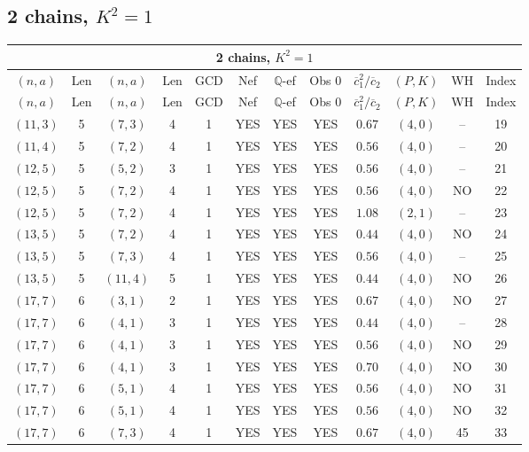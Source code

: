 \subsection{2 chains, $K^2 = 1$}
\begin{longtable}{|c|c|c|c|c|c|c|c|c|c|c|c|}
\hline
\multicolumn{12}{|c|}{2 chains, $K^2 = 1$}\\
\hline
$(n,a)$ & Len & $(n,a)$ & Len & GCD & Nef & $\mathbb Q$-ef & Obs 0 & $\overline c_1^2 / \overline c_2$ & $(P,K)$ & WH & Index\\
\hline
\endfirsthead

\hline
$(n,a)$ & Len & $(n,a)$ & Len & GCD & Nef & $\mathbb Q$-ef & Obs 0 & $\overline c_1^2 / \overline c_2$ & $(P,K)$ & WH & Index\\
\hline
\endhead
\hline
\endfoot

$(11,3)$ & 5 & $(7,3)$ & 4 & 1 & YES & YES & YES & $0.67$ & $(4,0)$ & -- & 19\\
$(11,4)$ & 5 & $(7,2)$ & 4 & 1 & YES & YES & YES & $0.56$ & $(4,0)$ & -- & 20\\
$(12,5)$ & 5 & $(5,2)$ & 3 & 1 & YES & YES & YES & $0.56$ & $(4,0)$ & -- & 21\\
$(12,5)$ & 5 & $(7,2)$ & 4 & 1 & YES & YES & YES & $0.56$ & $(4,0)$ & NO & 22\\
$(12,5)$ & 5 & $(7,2)$ & 4 & 1 & YES & YES & YES & $1.08$ & $(2,1)$ & -- & 23\\
$(13,5)$ & 5 & $(7,2)$ & 4 & 1 & YES & YES & YES & $0.44$ & $(4,0)$ & NO & 24\\
$(13,5)$ & 5 & $(7,3)$ & 4 & 1 & YES & YES & YES & $0.56$ & $(4,0)$ & -- & 25\\
$(13,5)$ & 5 & $(11,4)$ & 5 & 1 & YES & YES & YES & $0.44$ & $(4,0)$ & NO & 26\\
$(17,7)$ & 6 & $(3,1)$ & 2 & 1 & YES & YES & YES & $0.67$ & $(4,0)$ & NO & 27\\
$(17,7)$ & 6 & $(4,1)$ & 3 & 1 & YES & YES & YES & $0.44$ & $(4,0)$ & -- & 28\\
$(17,7)$ & 6 & $(4,1)$ & 3 & 1 & YES & YES & YES & $0.56$ & $(4,0)$ & NO & 29\\
$(17,7)$ & 6 & $(4,1)$ & 3 & 1 & YES & YES & YES & $0.70$ & $(4,0)$ & NO & 30\\
$(17,7)$ & 6 & $(5,1)$ & 4 & 1 & YES & YES & YES & $0.56$ & $(4,0)$ & NO & 31\\
$(17,7)$ & 6 & $(5,1)$ & 4 & 1 & YES & YES & YES & $0.56$ & $(4,0)$ & NO & 32\\
$(17,7)$ & 6 & $(7,3)$ & 4 & 1 & YES & YES & YES & $0.67$ & $(4,0)$ & 45 & 33\\

\end{longtable}
